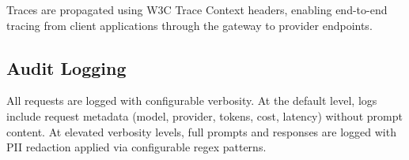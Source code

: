 Traces are propagated using W3C Trace Context headers, enabling end-to-end tracing from client applications through the gateway to provider endpoints.

\subsection{Audit Logging}

All requests are logged with configurable verbosity. At the default level, logs include request metadata (model, provider, tokens, cost, latency) without prompt content. At elevated verbosity levels, full prompts and responses are logged with PII redaction applied via configurable regex patterns.

